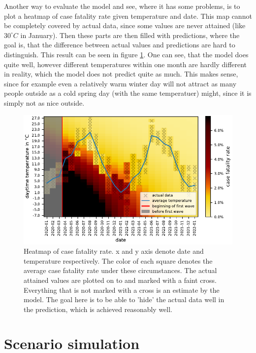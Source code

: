 \documentclass{article}
\begin{document}
Another way to evaluate the model and see, where it has some problems, is to plot a heatmap of case fatality rate given temperature and date. This map cannot be completely covered by actual data, since some values are never attained (like $30^\circ C$ in January). Then these parts are then filled with predictions, where the goal is, that the difference between actual values and predictions are hard to distinguish. This result can be seen in figure \ref{fig:heatmap}. One can see, that the model does quite well, however different temperatures within one month are hardly different in reality, which the model does not predict quite as much. This makes sense, since for example even a relatively warm winter day will not attract as many people outside as a cold spring day (with the same temperatuer) might, since it is simply not as nice outside.

\begin{figure}[hbt!]
  \begin{center}
    \includegraphics{../fig/heatmap.pdf}
    \caption{Heatmap of case fatality rate. x and y axis denote date and temperature respectively. The color of each square denotes the average case fatality rate under these circumstances. The actual attained values are plotted on to and marked with a faint cross. Everything that is not marked with a cross is an estimate by the model. The goal here is to be able to 'hide' the actual data well in the prediction, which is achieved reasonably well.}
    \label{fig:heatmap}
  \end{center}
\end{figure}

\section{Scenario simulation}
\end{document}
